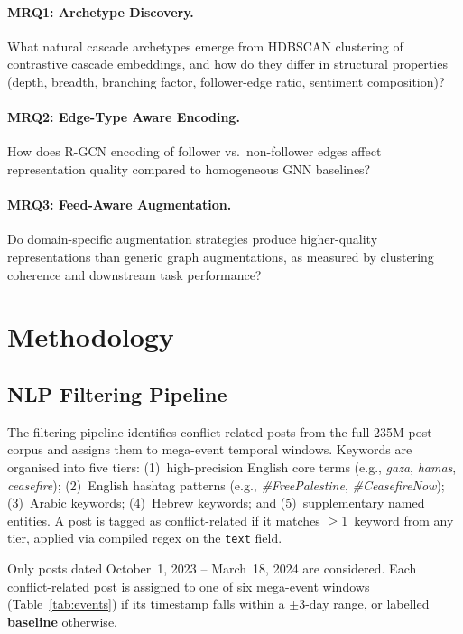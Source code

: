 \documentclass[12pt,a4paper]{article}
\begin{document}
\paragraph{MRQ1: Archetype Discovery.}
What natural cascade archetypes emerge from HDBSCAN clustering of contrastive
cascade embeddings, and how do they differ in structural properties (depth,
breadth, branching factor, follower-edge ratio, sentiment composition)?

\paragraph{MRQ2: Edge-Type Aware Encoding.}
How does R-GCN encoding of follower vs.\ non-follower edges affect
representation quality compared to homogeneous GNN baselines?

\paragraph{MRQ3: Feed-Aware Augmentation.}
Do domain-specific augmentation strategies produce higher-quality representations
than generic graph augmentations, as measured by clustering coherence and
downstream task performance?

\section{Methodology}

\subsection{NLP Filtering Pipeline}

The filtering pipeline identifies conflict-related posts from the full
235M-post corpus and assigns them to mega-event temporal windows.  Keywords are
organised into five tiers: (1)~high-precision English core terms (e.g.,
\emph{gaza}, \emph{hamas}, \emph{ceasefire}); (2)~English hashtag patterns
(e.g., \emph{\#FreePalestine}, \emph{\#CeasefireNow}); (3)~Arabic keywords;
(4)~Hebrew keywords; and (5)~supplementary named entities.  A post is tagged as
conflict-related if it matches $\geq$1~keyword from any tier, applied via
compiled regex on the \texttt{text} field.

Only posts dated October~1, 2023 -- March~18, 2024 are considered.  Each
conflict-related post is assigned to one of six mega-event windows
(Table~\ref{tab:events}) if its timestamp falls within a $\pm$3-day range, or
labelled \textbf{baseline} otherwise.
\end{document}
